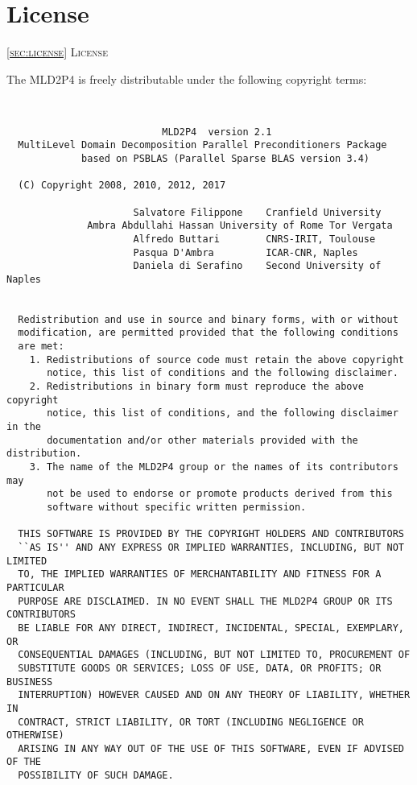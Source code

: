 \section{License\label{sec:license}}
         {\textsc{\ref{sec:license} License}}

The MLD2P4 is freely distributable under the following copyright
terms: {\small
\begin{verbatim} 

 
                           MLD2P4  version 2.1
  MultiLevel Domain Decomposition Parallel Preconditioners Package
             based on PSBLAS (Parallel Sparse BLAS version 3.4)
  
  (C) Copyright 2008, 2010, 2012, 2017

                      Salvatore Filippone    Cranfield University
   		      Ambra Abdullahi Hassan University of Rome Tor Vergata
                      Alfredo Buttari        CNRS-IRIT, Toulouse
                      Pasqua D'Ambra         ICAR-CNR, Naples
                      Daniela di Serafino    Second University of Naples

 
  Redistribution and use in source and binary forms, with or without
  modification, are permitted provided that the following conditions
  are met:
    1. Redistributions of source code must retain the above copyright
       notice, this list of conditions and the following disclaimer.
    2. Redistributions in binary form must reproduce the above copyright
       notice, this list of conditions, and the following disclaimer in the
       documentation and/or other materials provided with the distribution.
    3. The name of the MLD2P4 group or the names of its contributors may
       not be used to endorse or promote products derived from this
       software without specific written permission.
 
  THIS SOFTWARE IS PROVIDED BY THE COPYRIGHT HOLDERS AND CONTRIBUTORS
  ``AS IS'' AND ANY EXPRESS OR IMPLIED WARRANTIES, INCLUDING, BUT NOT LIMITED
  TO, THE IMPLIED WARRANTIES OF MERCHANTABILITY AND FITNESS FOR A PARTICULAR
  PURPOSE ARE DISCLAIMED. IN NO EVENT SHALL THE MLD2P4 GROUP OR ITS CONTRIBUTORS
  BE LIABLE FOR ANY DIRECT, INDIRECT, INCIDENTAL, SPECIAL, EXEMPLARY, OR
  CONSEQUENTIAL DAMAGES (INCLUDING, BUT NOT LIMITED TO, PROCUREMENT OF
  SUBSTITUTE GOODS OR SERVICES; LOSS OF USE, DATA, OR PROFITS; OR BUSINESS
  INTERRUPTION) HOWEVER CAUSED AND ON ANY THEORY OF LIABILITY, WHETHER IN
  CONTRACT, STRICT LIABILITY, OR TORT (INCLUDING NEGLIGENCE OR OTHERWISE)
  ARISING IN ANY WAY OUT OF THE USE OF THIS SOFTWARE, EVEN IF ADVISED OF THE
  POSSIBILITY OF SUCH DAMAGE.
 
\end{verbatim}
}

